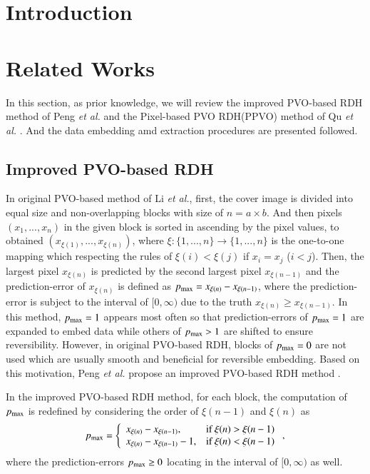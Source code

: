 \documentclass[review,3p,10pt,sort&compress]{elsarticle}
\begin{document}
\section{Introduction}\label{sec:1}

\section{Related Works}\label{sec:2}
In this section, as prior knowledge, we will review the improved PVO-based RDH method of Peng \emph{et al.} \cite{Peng2014IPVO} and the Pixel-based PVO RDH(PPVO) method of Qu \emph{et al.} \cite{Qu2015PPVO}. And the data embedding amd extraction procedures are presented followed.

\subsection{Improved PVO-based RDH \cite{Peng2014IPVO}}\label{sec:2.1}
In original PVO-based method \cite{Li2013PVO} of Li \emph{et al.}, first, the cover image is divided into equal size and non-overlapping blocks with size of $n = a \times b$. And then pixels $(x_{1},...,x_{n})$ in the given block is sorted in ascending by the pixel values, to obtained $(x_{\xi(1)},...,x_{\xi(n)})$, where $\xi : \{1,...,n\} \rightarrow \{1,...,n\}$ is the one-to-one mapping which respecting the rules of $\xi(i) < \xi(j)$ if $x_{i} = x_{j}$ ($i < j$). Then, the largest pixel $x_{\xi(n)}$ is predicted by the second largest pixel $x_{\xi(n-1)}$ and the prediction-error of $x_{\xi(n)}$ is defined as $p_{\rm max} = x_{\xi(n)} - x_{\xi(n-1)}$, where the prediction-error is subject to the interval of $[0, \infty)$ due to the truth $x_{\xi(n)} \geq x_{\xi(n-1)}$. In this method, $p_{\rm max} = 1$ appears  most often so that prediction-errors of $p_{\rm max} = 1$ are expanded to embed data while others of $p_{\rm max} > 1$
are shifted to ensure reversibility. However, in original PVO-based RDH, blocks of $p_{\rm max} = 0$ are not used which are usually smooth and beneficial for reversible embedding. Based on this motivation, Peng \emph{et al.} propose an improved PVO-based RDH method \cite{Peng2014IPVO}.

In the improved PVO-based RDH method, for each block, the computation of $p_{\rm max}$ is redefined by considering the order of $\xi(n-1)$ and $\xi(n)$ as
\begin{equation}\label{eq:pmax}
p_{\rm max} = \left\{\begin{array}{ll}
x_{\xi(n)} - x_{\xi(n-1)},      & \text{if } \xi(n) > \xi(n-1) \\
x_{\xi(n)} - x_{\xi(n-1)} - 1,  & \text{if } \xi(n) < \xi(n-1)
\end{array}\right.,
\end{equation}
where the prediction-errors $p_{\rm max} \geq 0$ locating in the interval of $[0, \infty)$ as well.
\end{document}
